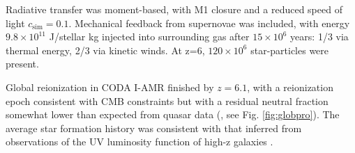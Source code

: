 \documentclass[twocolumn]{aastex61}
\newcommand{\dom}[1]{{#1}}
\begin{document}
\dom{Radiative transfer was moment-based, with M1 closure and a reduced speed of light $c_\mathrm{sim}=0.1$}. Mechanical feedback from supernovae was included, with energy $9.8\times 10^{11}$ J/stellar kg injected into
surrounding gas after $15\times 10^6$ years: 1/3 via thermal energy, 2/3 via kinetic winds. At z=6, $120\times 10^6$ star-particles were present.



Global reionization in CODA I-AMR finished by $z=6.1$, with a reionization epoch consistent with CMB constraints \citep{PLA15} but with a residual neutral fraction somewhat lower than expected from quasar data (\citet{FAN6}, see Fig. \ref{fig:globpro}). The average star formation history was consistent with that inferred from observations of the UV luminosity function of high-z galaxies \citep{BOU14,FIN15}.  
\end{document}
